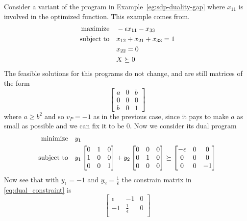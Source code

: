 \documentclass[a4paper,twoside,justified]{tufte-handout}
\begin{document}
\begin{example}\label{eg:sdp-close-gap}
  Consider a variant of the program in
  Example~\ref{eg:sdp-duality-gap} where $ x_{11} $ is involved in the
  optimized function. This example comes from\cite{gupta2011lecture12}.
  \begin{alignat}{2}
    \text{maximize}\hspace{1em}& -\epsilon x_{11} -x_{33}\\
    \text{subject to}\hspace{1em}& x_{12} + x_{21} + x_{33} = 1\\
    & x_{22}=0\\
    & X \succeq 0
  \end{alignat}
  The feasible solutions for this programs do not change, and are
  still matrices of the form
  \begin{equation}
    \begin{bmatrix}
      a & 0 & b\\
      0 & 0 & 0\\
      b & 0 & 1
    \end{bmatrix}
  \end{equation}
  where $ a \geq b^{2} $ and so $ v_{P}=-1$ as in the previous case,
  since it pays to make $ a$ as small as possible and we can fix it to
  be $ 0 $. Now we consider its dual program
  \begin{alignat}{2}
    \minimize y_{1}\\
    \subjectto y_{1} \begin{bmatrix}
      0 & 1 & 0\\
      1 & 0 & 0\\
      0 & 0 & 1
    \end{bmatrix} + 
    y_{2} \begin{bmatrix}
      0 & 0 & 0\\
      0 & 1 & 0\\
      0 & 0 & 0
    \end{bmatrix} 
    \succeq 
    \begin{bmatrix}
      -\epsilon & 0 & 0\\
      0 & 0 & 0\\
      0 & 0 & -1
    \end{bmatrix}\label{eq:dual_constraint}
  \end{alignat}
  Now see that with $ y_{1}=-1 $ and $ y_{2}= \frac{1}{\epsilon} $ the
  constrain matrix in \eqref{eq:dual_constraint} is
  \begin{equation}
    \begin{bmatrix}
      \epsilon & -1 & 0\\
      -1 & \frac{1}{\epsilon} & 0\\

\end{bmatrix}
\end{equation}
\end{example}
\end{document}
